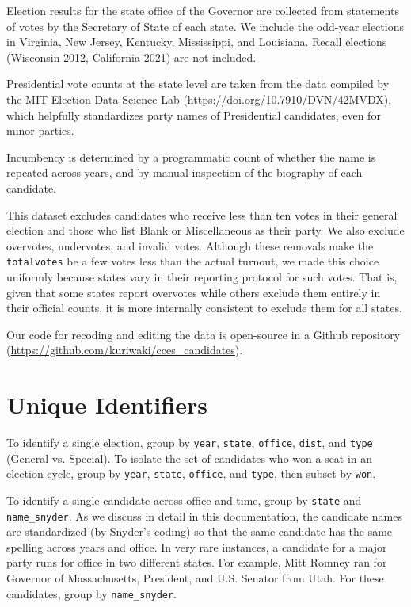 \documentclass[12pt]{article}
\begin{document}
Election results for the state office of the Governor are collected from statements of votes by the Secretary of State of each state. We include the odd-year elections in Virginia, New Jersey, Kentucky, Mississippi, and Louisiana.
Recall elections (Wisconsin 2012, California 2021) are not included.

Presidential vote counts at the state level are taken from the data compiled by the MIT Election Data Science Lab (\url{https://doi.org/10.7910/DVN/42MVDX}), which helpfully standardizes party names of Presidential candidates, even for minor parties.

Incumbency is determined by a programmatic count of whether the name is repeated across years, and by manual inspection of the biography of each candidate.

This dataset excludes candidates who receive less than ten votes in their general election and those who list Blank or Miscellaneous as their party.
We also exclude overvotes, undervotes, and invalid votes.
Although these removals make the \texttt{totalvotes} be a few votes less than the actual turnout, we made this choice uniformly because states vary in their reporting protocol for such votes. That is, given that some states report overvotes while others exclude them entirely in their official counts, it is more internally consistent to exclude them for all states.

Our code for recoding and editing the data is open-source in a Github repository (\url{https://github.com/kuriwaki/cces_candidates}).


\section{Unique Identifiers}

To identify a single election, group by \texttt{year}, \texttt{state}, \texttt{office}, \texttt{dist}, and \texttt{type} (General vs. Special).  To isolate the set of candidates who won a seat in an election cycle, group by \texttt{year}, \texttt{state}, \texttt{office}, and \texttt{type}, then subset by \texttt{won}.

To identify a single candidate across office and time, group by \texttt{state} and  \texttt{name\_snyder}.
As we discuss in detail in this documentation, the candidate names are standardized (by Snyder's coding) so that the same candidate has the same spelling across years and office.
In very rare instances, a candidate for a major party runs for office in two different states. For example, Mitt Romney ran for Governor of Massachusetts, President, and U.S. Senator from Utah. For these candidates, group by \texttt{name\_snyder}.
\end{document}
